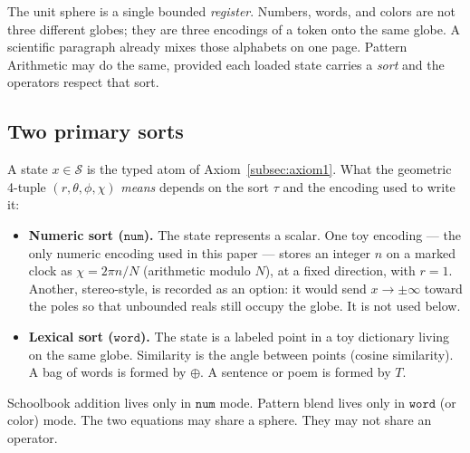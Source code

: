 \documentclass[12pt, a4paper]{article}
\begin{document}
The unit sphere is a single bounded \emph{register}.
Numbers, words, and colors are not three different globes; they are
three encodings of a token onto the same globe. A scientific paragraph
already mixes those alphabets on one page. Pattern Arithmetic may do
the same, provided each loaded state carries a \emph{sort} and the
operators respect that sort.

\subsection{Two primary sorts}
\label{subsec:sorts}
A state $x\in\mathcal{S}$ is the typed atom of
Axiom~\ref{subsec:axiom1}. What the geometric 4-tuple
$(r,\theta,\phi,\chi)$ \emph{means} depends on the sort $\tau$ and the
encoding used to write it:
\begin{itemize}
    \item \textbf{Numeric sort ($\mathtt{num}$).}
          The state represents a scalar. One toy encoding --- the only
          numeric encoding used in this paper --- stores an
          integer $n$ on a marked clock as
          $\chi = 2\pi n/N$ (arithmetic modulo $N$), at a fixed
          direction, with $r=1$.
          Another, stereo-style, is recorded as an option: it would
          send $x\to\pm\infty$ toward the
          poles so that unbounded reals still occupy the globe. It is
          not used below.
    \item \textbf{Lexical sort ($\mathtt{word}$).}
          The state is a labeled point in a toy dictionary living on
          the same globe. Similarity is the angle between points
          (cosine similarity). A bag of words is formed by $\oplus$.
          A sentence or poem is formed by $T$.
\end{itemize}
Schoolbook addition lives only in $\mathtt{num}$ mode.
Pattern blend lives only in $\mathtt{word}$ (or color) mode.
The two equations may share a sphere. They may not share an operator.
\end{document}
